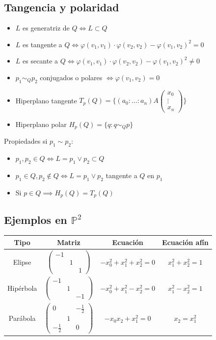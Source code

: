 \documentclass[leqno]{article}
\renewcommand{\P}{\mathbb{P}}
\begin{document}
\subsection{Tangencia y polaridad}
\begin{itemize}
  \item $L$ es generatriz de  $Q \iff L\subset Q$
  \item $L$ es tangente a  $Q \iff \varphi(v_1, v_1)\cdot \varphi(v_2,v_2)-\varphi (v_1, v_2)^2=0 $
  \item $L$ es secante a  $Q \iff \varphi(v_1, v_1)\cdot \varphi(v_2,v_2)-\varphi (v_1, v_2)^2\neq 0 $
  \item $p_1\sim_Q p_2$ conjugados o polares $\iff \varphi (v_1, v_2)=0$
  \item Hiperplano tangente $T_p(Q) = \{(a_0:\ldots:a_n)A\begin{pmatrix} x_0\\ \vdots\\ x_n \end{pmatrix} \}$
  \item Hiperplano polar $H_p(Q)=\{q : q\sim_Q p\}$
\end{itemize}
Propiedades si $p_1\sim p_2$:
\begin{itemize}
  \item $p_1, p_2 \in Q \iff L=p_1\lor p_2 \subset Q$
  \item $p_1\in Q, p_2\not\in Q \iff L=p_1 \lor p_2$ tangente a $Q$ en $p_1$
  \item Si $p\in Q \implies H_p(Q) = T_p(Q)$
\end{itemize}

\subsection{Ejemplos en $\P^2$}
\begin{center}
\begin{tabular}{|c|c|c|c|}
\hline
Tipo & Matriz & Ecuación & Ecuación afín \\
\hline
Elipse & $\begin{pmatrix} -1 & & \\ & 1 & \\ & & 1 \end{pmatrix}$ & $-x_0^2 + x_1^2 + x_2^2=0$ & $x_1^2+x_2^2=1$\\
\hline
Hipérbola & $\begin{pmatrix} -1 & & \\ & 1 & \\ & & -1 \end{pmatrix}$ & $-x_0^2 + x_1^2 - x_2^2=0$ & $x_1^2-x_2^2=1$\\
\hline
Parábola & $\begin{pmatrix} 0 & & -\frac{1}{2}  \\  & 1 & \\ -\frac{1}{2} & & 0 \end{pmatrix}$ & $-x_0x_2 + x_1^2 =0$ & $x_2=x_1^2$\\
\hline

\end{tabular}
\end{center}
\end{document}
